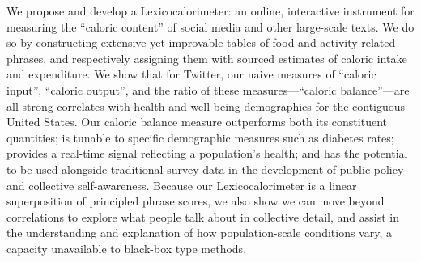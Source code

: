 We propose and develop a Lexicocalorimeter: 
an online, interactive instrument for measuring the ``caloric
content'' of social media and other large-scale texts.
We do so by constructing extensive yet improvable
tables of food and activity related phrases,
and respectively assigning them with sourced estimates of caloric 
intake and expenditure.
We show that for Twitter, our naive measures of 
``caloric input'', ``caloric output'', and
the ratio of these measures---``caloric balance''---are all strong
correlates with health and well-being demographics for the
contiguous United States.
Our caloric balance measure outperforms both its constituent quantities;
is tunable to specific demographic measures such as diabetes rates;
provides a real-time signal reflecting a population's health;
and has the potential to be used alongside
traditional survey data in the development 
of public policy and collective self-awareness.
Because our Lexicocalorimeter is a linear superposition
of principled phrase scores,
we also show we can move beyond correlations to explore what people talk about in 
collective detail, and
assist in the understanding and explanation of how population-scale conditions vary,
a capacity unavailable to black-box type methods.
